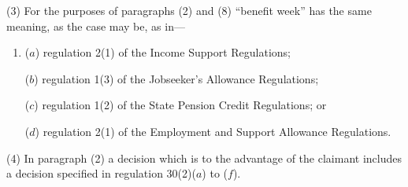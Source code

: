 \documentclass[12pt,a4paper]{article}
\begin{document}

(3) For the purposes of paragraphs (2) and (8) “benefit week” has the same meaning, as the case may be, as in—
\begin{enumerate}\item[]
($a$) regulation 2(1) of the Income Support Regulations;

($b$) regulation 1(3) of the Jobseeker’s Allowance Regulations;

($c$) regulation 1(2) of the State Pension Credit Regulations; or

($d$) regulation 2(1) of the Employment and Support Allowance Regulations.
\end{enumerate}

(4) In paragraph (2) a decision which is to the advantage of the claimant includes a decision specified in regulation 30(2)($a$) to ($f$).

%
\end{document}
